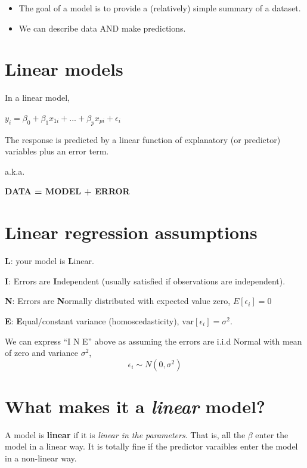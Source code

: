 \documentclass[
]{book}
\providecommand{\tightlist}{%
  \setlength{\itemsep}{0pt}\setlength{\parskip}{0pt}}
\begin{document}
\begin{itemize}
\tightlist
\item
  The goal of a model is to provide a (relatively) simple summary of a dataset.
\item
  We can describe data AND make predictions.
\end{itemize}

\hypertarget{linear-models}{%
\section{Linear models}\label{linear-models}}

In a linear model,

\(y_i = \beta_0 + \beta_1x_{1i} + ... + \beta_px_{pi} + \epsilon_i\)

The response is predicted by a linear function of
explanatory (or predictor) variables plus an error term.

a.k.a.

\textbf{DATA = MODEL + ERROR}

\hypertarget{linear-regression-assumptions}{%
\section{Linear regression assumptions}\label{linear-regression-assumptions}}

\textbf{L}: your model is \textbf{L}inear.

\textbf{I}: Errors are \textbf{I}ndependent (usually satisfied if observations are independent).

\textbf{N}: Errors are \textbf{N}ormally distributed with expected value zero, \(E[\epsilon_i]=0\)

\textbf{E}: \textbf{E}qual/constant variance (homoscedasticity), \(\text{var}[\epsilon_i] = \sigma^2\).

We can express ``I N E'' above as assuming the errors are i.i.d Normal with mean of zero and variance \(\sigma^2\),
\[\epsilon_i \sim N(0, \sigma^2)\]

\hypertarget{what-makes-it-a-linear-model}{%
\section{\texorpdfstring{What makes it a \emph{linear} model?}{What makes it a linear model?}}\label{what-makes-it-a-linear-model}}

A model is \textbf{linear} if it is \emph{linear in the parameters}. That is, all the \(\beta\) enter the model in a linear way. It is totally fine if the predictor varaibles enter the model in a non-linear way.
\end{document}

